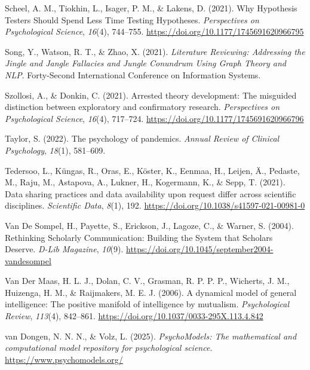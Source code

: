 \documentclass[
  man, noextraspace,floatsintext]{apa7}
\newlength{\cslhangindent}
\newenvironment{CSLReferences}[2] %
 {\begin{list}{}{%
  \setlength{\itemindent}{0pt}
  \setlength{\leftmargin}{0pt}
  \setlength{\parsep}{0pt}
  \ifodd #1
   \setlength{\leftmargin}{\cslhangindent}
   \setlength{\itemindent}{-1\cslhangindent}
  \fi
  \setlength{\itemsep}{#2\baselineskip}}}
 {\end{list}}
\begin{document}
\begin{CSLReferences}{1}{0}
Scheel, A. M., Tiokhin, L., Isager, P. M., \& Lakens, D. (2021). Why {Hypothesis Testers Should Spend Less Time Testing Hypotheses}. \emph{Perspectives on Psychological Science}, \emph{16}(4), 744--755. \url{https://doi.org/10.1177/1745691620966795}

Song, Y., Watson, R. T., \& Zhao, X. (2021). \emph{Literature {Reviewing}: {Addressing} the {Jingle} and {Jangle Fallacies} and {Jungle Conundrum Using Graph Theory} and {NLP}}. Forty-{Second International Conference} on {Information Systems}.

Szollosi, A., \& Donkin, C. (2021). Arrested theory development: {The} misguided distinction between exploratory and confirmatory research. \emph{Perspectives on Psychological Science}, \emph{16}(4), 717--724. \url{https://doi.org/10.1177/1745691620966796}

Taylor, S. (2022). The psychology of pandemics. \emph{Annual Review of Clinical Psychology}, \emph{18}(1), 581--609.

Tedersoo, L., Küngas, R., Oras, E., Köster, K., Eenmaa, H., Leijen, Ä., Pedaste, M., Raju, M., Astapova, A., Lukner, H., Kogermann, K., \& Sepp, T. (2021). Data sharing practices and data availability upon request differ across scientific disciplines. \emph{Scientific Data}, \emph{8}(1), 192. \url{https://doi.org/10.1038/s41597-021-00981-0}

Van De Sompel, H., Payette, S., Erickson, J., Lagoze, C., \& Warner, S. (2004). Rethinking {Scholarly Communication}: {Building} the {System} that {Scholars Deserve}. \emph{D-Lib Magazine}, \emph{10}(9). \url{https://doi.org/10.1045/september2004-vandesompel}

Van Der Maas, H. L. J., Dolan, C. V., Grasman, R. P. P. P., Wicherts, J. M., Huizenga, H. M., \& Raijmakers, M. E. J. (2006). A dynamical model of general intelligence: {The} positive manifold of intelligence by mutualism. \emph{Psychological Review}, \emph{113}(4), 842--861. \url{https://doi.org/10.1037/0033-295X.113.4.842}

van Dongen, N. N. N., \& Volz, L. (2025). \emph{{PsychoModels}: {The} mathematical and computational model repository for psychological science.} \url{https://www.psychomodels.org/}


\end{CSLReferences}
\end{document}
